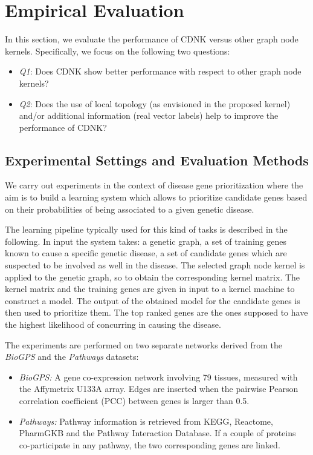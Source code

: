 \documentclass[review]{elsarticle}
\begin{document}
\section{Empirical Evaluation}
\label{empirical-evaluation-cdnk}
In this section, we evaluate the performance of CDNK versus other graph node kernels. Specifically, we focus on the following two questions:
\begin{itemize}
\item {\it Q1}: Does CDNK show better performance with respect to other graph node kernels?
\item {\it Q2}: Does the use of local topology (as envisioned in the proposed kernel) and/or additional information (real vector labels) help to  improve the performance of CDNK?
\end{itemize}

\subsection{Experimental Settings and Evaluation Methods}
We carry out experiments in the context of disease gene prioritization where the aim is to build a learning system which allows to prioritize candidate genes based on their probabilities of being associated to a given genetic disease.

The learning pipeline typically used for this kind of tasks is described in the following. In input the system takes: a genetic graph, a set of training genes known to cause a specific genetic disease, a set of candidate genes which are suspected to be involved as well in the disease. The selected graph node kernel is applied to the genetic graph, so to obtain the corresponding kernel matrix. The kernel matrix and the training genes are given in input to a kernel machine to construct a model.  The output of the obtained model for the candidate genes is then used to prioritize them. The top ranked genes are the ones supposed to have the highest likelihood of concurring in causing the disease.

The experiments are performed on two separate networks derived from the {\it BioGPS} and the {\it Pathways} datasets:
\begin{itemize}
\item \textit{BioGPS:} A gene co-expression network involving 79 tissues, measured with the Affymetrix U133A array. Edges are inserted when the pairwise Pearson correlation coefficient (PCC) between genes is larger than 0.5.

\item \textit{Pathways:} Pathway information is retrieved from KEGG, Reactome, PharmGKB and the Pathway Interaction Database. If a couple of proteins co-participate in any pathway, the two corresponding genes are linked.  
\end{itemize}
\end{document}

